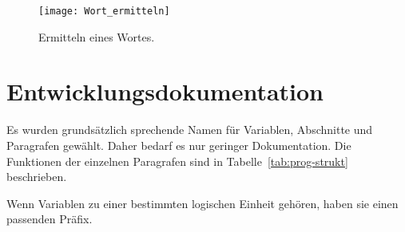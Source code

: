 \begin{figure}[!h]
    \centering
    \texttt{[image: Wort\_ermitteln]}
    \caption{
        Ermitteln eines Wortes.
    }
    \label{fig:diagramm4}
\end{figure}


\section{Entwicklungsdokumentation}\label{sec:entwicklerdokumentation}


Es wurden grundsätzlich sprechende Namen für Variablen, Abschnitte und Paragrafen gewählt.
Daher bedarf es nur geringer Dokumentation.
Die Funktionen der einzelnen Paragrafen sind in Tabelle~\ref{tab:prog-strukt} beschrieben.

Wenn Variablen zu einer bestimmten logischen Einheit gehören, haben sie einen passenden Präfix.

